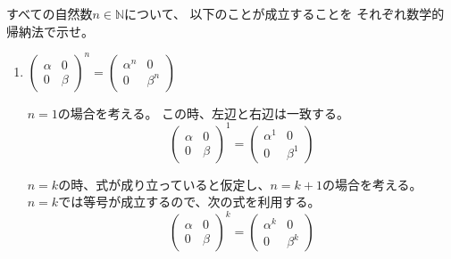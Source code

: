 \documentclass[12pt,b5paper]{ltjsarticle}
\begin{document}
\hrulefill

すべての自然数$n\in\mathbb{N}$について、
以下のことが成立することを
それぞれ数学的帰納法で示せ。
\begin{enumerate}
 \item $\displaystyle \begin{pmatrix}\alpha & 0 \\ 0 & \beta \end{pmatrix}^{\!\!n} = \begin{pmatrix}\alpha^{n} & 0 \\ 0 & \beta^{n} \end{pmatrix}$

       \hrulefill

       $n=1$の場合を考える。
       この時、左辺と右辺は一致する。
       \begin{equation}
        \begin{pmatrix}\alpha & 0 \\ 0 & \beta \end{pmatrix}^{\!\!1} = \begin{pmatrix}\alpha^{1} & 0 \\ 0 & \beta^{1} \end{pmatrix}
       \end{equation}

       \dotfill

       $n=k$の時、式が成り立っていると仮定し、$n=k+1$の場合を考える。
       $n=k$では等号が成立するので、次の式を利用する。
       \begin{equation}
        \begin{pmatrix}\alpha & 0 \\ 0 & \beta \end{pmatrix}^{\!\!k} = \begin{pmatrix}\alpha^{k} & 0 \\ 0 & \beta^{k} \end{pmatrix}
       \end{equation}


\end{enumerate}
\end{document}
